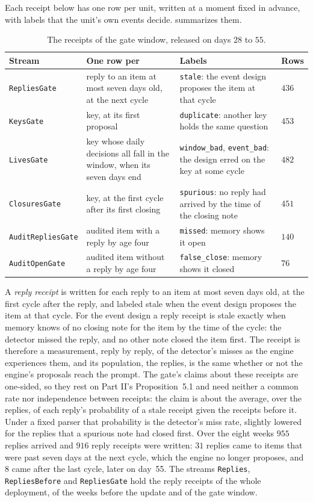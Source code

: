 \documentclass[11pt]{article}
\newcommand{\code}[1]{\texttt{#1}}
\theoremstyle{definition}
\theoremstyle{plain}
\begin{document}
Each receipt below has one row per unit, written at a moment fixed in advance, with labels that the
unit's own events decide.  summarizes them.

\begin{table}[ht]
\centering\small
\begin{tabularx}{\textwidth}{>{\raggedright\arraybackslash}p{3.0cm}>{\raggedright\arraybackslash}p{4.2cm}X>{\raggedleft\arraybackslash}p{0.9cm}}
\toprule
Stream & One row per & Labels & Rows\\
\midrule
\code{RepliesGate} & reply to an item at most seven days old, at the next cycle & \code{stale}:
the event design proposes the item at that cycle & $436$\\
\code{KeysGate} & key, at its first proposal & \code{duplicate}: another key holds the same
question & $453$\\
\code{LivesGate} & key whose daily decisions all fall in the window, when its seven days end &
\code{window\_bad}, \code{event\_bad}: the design erred on the key at some cycle & $482$\\
\code{ClosuresGate} & key, at the first cycle after its first closing & \code{spurious}: no reply
had arrived by the time of the closing note & $451$\\
\code{AuditRepliesGate} & audited item with a reply by age four & \code{missed}: memory shows it
open & $140$\\
\code{AuditOpenGate} & audited item without a reply by age four & \code{false\_close}: memory
shows it closed & $76$\\
\bottomrule
\end{tabularx}
\caption{The receipts of the gate window, released on days $28$ to $55$.}\label{tab:units}
\end{table}

A \emph{reply receipt} is written for each reply to an item at most seven days old, at the first
cycle after the reply, and labeled stale when the event design proposes the item at that cycle. For
the event design a reply receipt is stale exactly when memory knows of no closing note for the item
by the time of the cycle: the detector missed the reply, and no other note closed the item first.
The receipt is therefore a measurement, reply by reply, of the detector's misses as the engine
experiences them, and its population, the replies, is the same whether or not the engine's
proposals reach the prompt. The gate's claims about these receipts are one-sided, so they rest on
Part II's Proposition~5.1 and need neither a common rate nor independence between receipts: the
claim is about the average, over the replies, of each reply's probability of a stale receipt given
the receipts before it. Under a fixed parser that probability is the detector's miss rate, slightly
lowered for the replies that a spurious note had closed first. Over the
eight weeks $955$ replies arrived and $916$ reply receipts were written: $31$ replies came to items
that were past seven days at the next cycle, which the engine no longer proposes, and $8$ came after
the last cycle, later on day~55. The streams \code{Replies}, \code{RepliesBefore} and
\code{RepliesGate} hold the reply receipts of the whole deployment, of the weeks before the update
and of the gate window.
\end{document}
